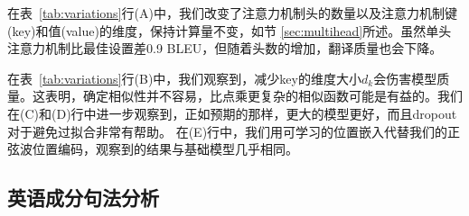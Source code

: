 
在表~\ref{tab:variations}行(A)中，我们改变了注意力机制头的数量以及注意力机制键(key)和值(value)的维度，保持计算量不变，如节 \ref{sec:multihead}所述。虽然单头注意力机制比最佳设置差0.9 BLEU，但随着头数的增加，翻译质量也会下降。


在表~\ref{tab:variations}行(B)中，我们观察到，减少key的维度大小$d_k$会伤害模型质量。这表明，确定相似性并不容易，比点乘更复杂的相似函数可能是有益的。我们在(C)和(D)行中进一步观察到，正如预期的那样，更大的模型更好，而且dropout对于避免过拟合非常有帮助。 在(E)行中，我们用可学习的位置嵌入代替我们的正弦波位置编码\citep{JonasFaceNet2017}，观察到的结果与基础模型几乎相同。




\subsection{英语成分句法分析}

